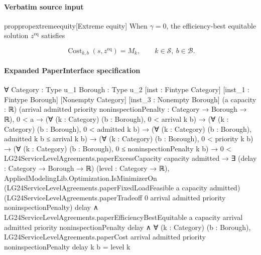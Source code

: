 \documentclass[10pt]{article}
\begin{document}
\paragraph{Verbatim source input}
\begin{ReviewVerbatim}
\begin{restatable}{prop}{propextremeequity}[Extreme equity]
\label{prop:extremefair}
When $\gamma=0$, {the efficiency-best equitable solution $z^{\mathrm{eq}}$ satisfies}







\begin{equation}
    {\operatorname{Cost}_{k,b}(s,z^{\mathrm{eq}})=M_k,
      \qquad k\in\mathcal S,\ b\in\mathcal B.}
\end{equation}


\end{restatable}
\end{ReviewVerbatim}



\paragraph{Expanded PaperInterface specification}
\begin{ReviewVerbatim}
∀ {Category : Type u_1} {Borough : Type u_2} [inst : Fintype Category] [inst_1 : Fintype Borough] [Nonempty Category]
  [inst_3 : Nonempty Borough] (a capacity : ℝ)
  (arrival admitted priority noninspectionPenalty : Category → Borough → ℝ),
  0 < a →
    (∀ (k : Category) (b : Borough), 0 < arrival k b) →
      (∀ (k : Category) (b : Borough), 0 < admitted k b) →
        (∀ (k : Category) (b : Borough), admitted k b ≤ arrival k b) →
          (∀ (k : Category) (b : Borough), 0 < priority k b) →
            (∀ (k : Category) (b : Borough), 0 ≤ noninspectionPenalty k b) →
              0 < LG24ServiceLevelAgreements.paperExcessCapacity capacity admitted →
                ∃ (delay : Category → Borough → ℝ) (level : Category → ℝ),
                  AppliedModelingLib.Optimization.IsMinimizerOn
                      (LG24ServiceLevelAgreements.paperFixedLoadFeasible a capacity admitted)
                      (LG24ServiceLevelAgreements.paperTradeoff 0 arrival admitted priority noninspectionPenalty)
                      delay ∧
                    LG24ServiceLevelAgreements.paperEfficiencyBestEquitable a capacity arrival admitted priority
                        noninspectionPenalty delay ∧
                      ∀ (k : Category) (b : Borough),
                        LG24ServiceLevelAgreements.paperCost arrival admitted priority noninspectionPenalty delay k b =
                          level k
\end{ReviewVerbatim}
\end{document}
